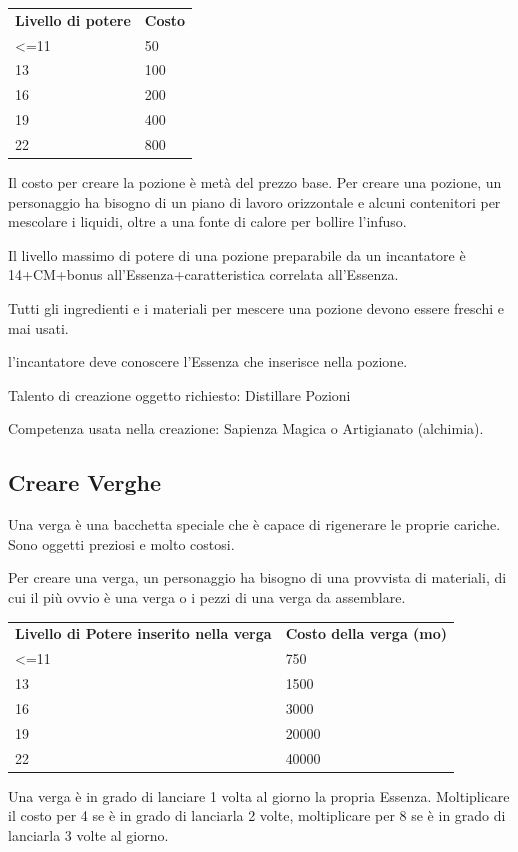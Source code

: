 \documentclass[a4paper,11pt,twoside,openany]{book}
\begin{document}
{\bigskip

\begin{tabular}{ll}
\toprule
\textbf{Livello di potere} & \textbf{Costo}\tabularnewline
\textless=11 & 50\tabularnewline
13 & 100\tabularnewline
16 & 200\tabularnewline
19 & 400\tabularnewline
22 & 800\tabularnewline
\end{tabular}

\bigskip

Il costo per creare la pozione è metà del prezzo base. Per creare una pozione, un personaggio ha bisogno di un piano di lavoro orizzontale e alcuni contenitori per mescolare i liquidi, oltre a una fonte di calore per bollire l'infuso.

Il livello massimo di potere di una pozione preparabile da un incantatore è 14+CM+bonus all'Essenza+caratteristica correlata all'Essenza.

Tutti gli ingredienti e i materiali per mescere una pozione devono essere freschi e mai usati.

l'incantatore deve conoscere l'Essenza che inserisce nella pozione.

Talento di creazione oggetto richiesto: Distillare Pozioni

Competenza usata nella creazione: Sapienza Magica o Artigianato (alchimia).

\subsection{Creare Verghe}

Una verga è una bacchetta speciale che è capace di rigenerare le proprie cariche. Sono oggetti preziosi e molto costosi.

Per creare una verga, un personaggio ha bisogno di una provvista di materiali, di cui il più ovvio è una verga o i pezzi di una verga da assemblare.

\medskip

\begin{tabular}{ll}
\toprule
\textbf{Livello di Potere inserito nella verga} & \textbf{Costo della verga (mo)}\tabularnewline
\textless=11 & 750\tabularnewline
13 & 1500\tabularnewline
16 & 3000\tabularnewline
19 & 20000\tabularnewline
22 & 40000\tabularnewline
\end{tabular}

\bigskip

Una verga è in grado di lanciare 1 volta al giorno la propria Essenza. Moltiplicare il costo per 4 se è in grado di lanciarla 2 volte, moltiplicare per 8 se è in grado di lanciarla 3 volte al giorno. 

}
\end{document}
